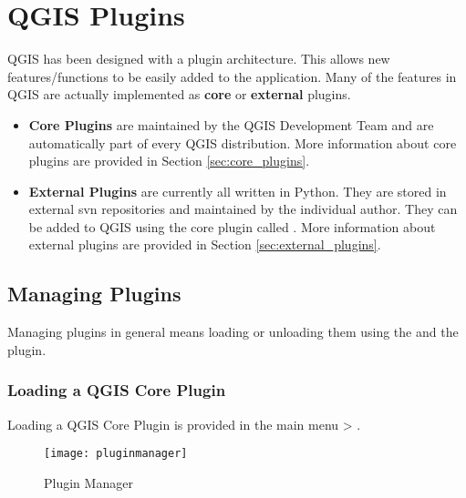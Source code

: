 \section{QGIS Plugins}

\updatedisclaimer

QGIS has been designed with a plugin architecture.
This allows new features/functions to be easily added to the application.
Many of the features in QGIS are actually implemented as \textbf{core} or \textbf{external} plugins. 

\begin{itemize}
\item \textbf{Core Plugins} are maintained by the QGIS Development Team and are automatically part of every QGIS distribution.
More information about core plugins are provided in Section \ref{sec:core_plugins}.
\item \textbf{External Plugins} are currently all written in Python.
They are stored in external svn repositories and maintained by the individual author.
They can be added to QGIS using the core plugin called .
More information about external plugins are provided in Section \ref{sec:external_plugins}.
\end{itemize}

\subsection{Managing Plugins}\label{sec:managing_plugins}

Managing plugins in general means loading or unloading them using the  and the  plugin. 

\subsubsection{Loading a QGIS Core Plugin}\label{sec:load_core_plugin} 

Loading a QGIS Core Plugin is provided in the main menu  > .

\begin{figure}[ht]
   \begin{center}
   \caption{Plugin Manager \nixcaption}\label{fig:pluginmanager}\smallskip
   \texttt{[image: pluginmanager]}
\end{center}
\end{figure}

